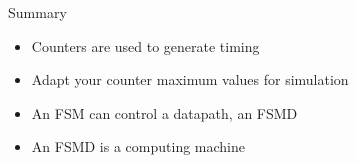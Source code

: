 \begin{frame}[fragile]{Summary}
\begin{itemize}
\item Counters are used to generate timing
\item Adapt your counter maximum values for simulation
\item An FSM can control a datapath, an FSMD
\item An FSMD is a computing machine
\end{itemize}
\end{frame}




